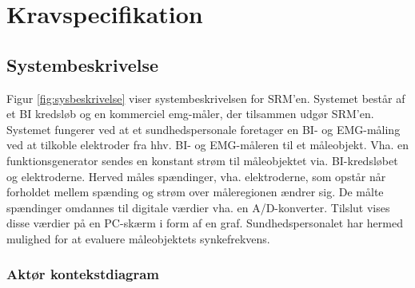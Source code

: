 \chapter{Kravspecifikation}
%
%    





\section{Systembeskrivelse}
Figur \ref{fig:sysbeskrivelse} viser systembeskrivelsen for SRM'en. Systemet består af et BI kredsløb og en kommerciel emg-måler, der tilsammen udgør SRM'en. Systemet fungerer ved at et sundhedspersonale foretager en BI- og EMG-måling ved at tilkoble elektroder fra hhv. BI- og EMG-måleren til et måleobjekt. Vha. en funktionsgenerator sendes en konstant strøm til måleobjektet via. BI-kredsløbet og elektroderne. Herved måles spændinger, vha. elektroderne, som opstår når forholdet mellem spænding og strøm over måleregionen ændrer sig. De målte spændinger omdannes til digitale værdier vha.  en A/D-konverter. Tilslut vises disse værdier på en PC-skærm i form af en graf. Sundhedspersonalet har hermed mulighed for at evaluere måleobjektets synkefrekvens. 
\subsection{Aktør kontekstdiagram}

